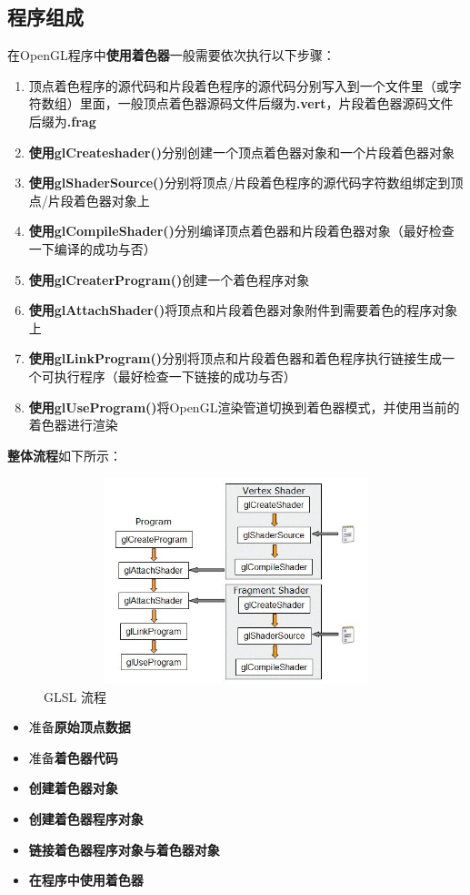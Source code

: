 \documentclass[UTF8,a4paper,12pt]{ctexbook}
\begin{document}
		\subsection{程序组成}
			在OpenGL程序中\textbf{使用着色器}一般需要依次执行以下步骤：
			\begin{enumerate}[itemindent = 1em]
				\item 顶点着色程序的源代码和片段着色程序的源代码分别写入到一个文件里（或字符数组）里面，一般顶点着色器源码文件后缀为\textbf{.vert}，片段着色器源码文件后缀为\textbf{.frag}
				\item \textbf{使用glCreateshader()}分别创建一个顶点着色器对象和一个片段着色器对象
				\item \textbf{使用glShaderSource()}分别将顶点/片段着色程序的源代码字符数组绑定到顶点/片段着色器对象上
				\item \textbf{使用glCompileShader()}分别编译顶点着色器和片段着色器对象（最好检查一下编译的成功与否）
				\item \textbf{使用glCreaterProgram()}创建一个着色程序对象
				\item \textbf{使用glAttachShader()}将顶点和片段着色器对象附件到需要着色的程序对象上
				\item \textbf{使用glLinkProgram()}分别将顶点和片段着色器和着色程序执行链接生成一个可执行程序（最好检查一下链接的成功与否）
				\item \textbf{使用glUseProgram()}将OpenGL渲染管道切换到着色器模式，并使用当前的着色器进行渲染
			\end{enumerate}	
		
			\textbf{整体流程}如下所示：
			\begin{figure}[htbp]
				\centering
				\includegraphics[width = 12cm, height = 6cm]{GLSLProcess.png}
				\caption{GLSL 流程}
				\label{GLSL}
			\end{figure}
			
			\begin{itemize}[itemindent = 1em]
				\item 准备\textbf{原始顶点数据}
				\item 准备\textbf{着色器代码}
				\item \textbf{创建着色器对象}
				\item \textbf{创建着色器程序对象}
				\item \textbf{链接着色器程序对象与着色器对象}
				\item \textbf{在程序中使用着色器}
			\end{itemize}	
\end{document}

